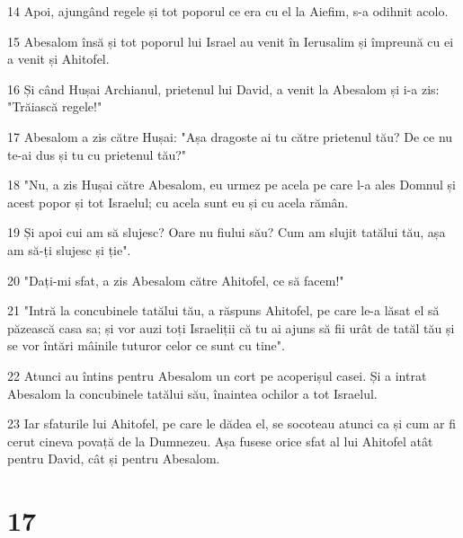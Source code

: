 \par 14 Apoi, ajungând regele și tot poporul ce era cu el la Aiefim, s-a odihnit acolo.
\par 15 Abesalom însă și tot poporul lui Israel au venit în Ierusalim și împreună cu ei a venit și Ahitofel.
\par 16 Și când Hușai Archianul, prietenul lui David, a venit la Abesalom și i-a zis: "Trăiască regele!"
\par 17 Abesalom a zis către Hușai: "Așa dragoste ai tu către prietenul tău? De ce nu te-ai dus și tu cu prietenul tău?"
\par 18 "Nu, a zis Hușai către Abesalom, eu urmez pe acela pe care l-a ales Domnul și acest popor și tot Israelul; cu acela sunt eu și cu acela rămân.
\par 19 Și apoi cui am să slujesc? Oare nu fiului său? Cum am slujit tatălui tău, așa am să-ți slujesc și ție".
\par 20 "Dați-mi sfat, a zis Abesalom către Ahitofel, ce să facem!"
\par 21 "Intră la concubinele tatălui tău, a răspuns Ahitofel, pe care le-a lăsat el să păzească casa sa; și vor auzi toți Israeliții că tu ai ajuns să fii urât de tatăl tău și se vor întări mâinile tuturor celor ce sunt cu tine".
\par 22 Atunci au întins pentru Abesalom un cort pe acoperișul casei. Și a intrat Abesalom la concubinele tatălui său, înaintea ochilor a tot Israelul.
\par 23 Iar sfaturile lui Ahitofel, pe care le dădea el, se socoteau atunci ca și cum ar fi cerut cineva povață de la Dumnezeu. Așa fusese orice sfat al lui Ahitofel atât pentru David, cât și pentru Abesalom.

\chapter{17}

